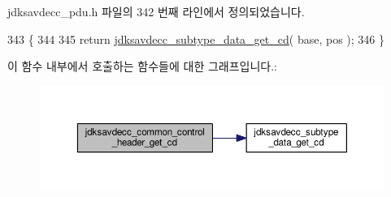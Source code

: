 jdksavdecc\+\_\+pdu.\+h 파일의 342 번째 라인에서 정의되었습니다.


\begin{DoxyCode}
343 \{
344 
345     \textcolor{keywordflow}{return} \hyperlink{group__jdksavdecc__subtype__data_gaf5db5e527db7fc0c8af94b6067c527b5}{jdksavdecc\_subtype\_data\_get\_cd}( base, pos );
346 \}
\end{DoxyCode}


이 함수 내부에서 호출하는 함수들에 대한 그래프입니다.\+:
\nopagebreak
\begin{figure}[H]
\begin{center}
\leavevmode
\includegraphics[width=350pt]{group__jdksavdecc__avtp__common__control__header_gafcc86a6636d8793da33a2da4995b3a15_cgraph}
\end{center}
\end{figure}




